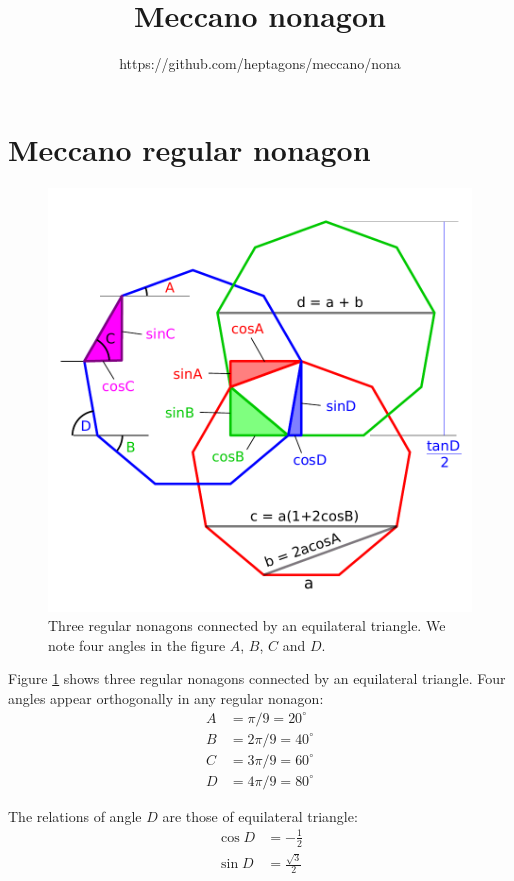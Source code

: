 \documentclass[11pt]{article}
\title{\textbf{Meccano nonagon}}
\author{https://github.com/heptagons/meccano/nona}
\date{}
\begin{document}
\maketitle

\section{Meccano regular nonagon}

\begin{figure}
\centering
\includegraphics[scale=0.75]{figs/3nonagons}
\caption{Three regular nonagons connected by an equilateral triangle.
We note four angles in the figure $A$, $B$, $C$ and $D$.}
\label{fig:1}
\end{figure}

Figure \ref{fig:1} shows three regular nonagons connected by an equilateral 
triangle. Four angles appear orthogonally in any regular nonagon:
\begin{align*}
A &= \pi/9 = 20^{\circ} \\
B &= 2\pi/9 = 40^{\circ} \\
C &= 3\pi/9 = 60^{\circ} \\
D &= 4\pi/9 = 80^{\circ}
\end{align*}

The relations of angle $D$ are those of equilateral triangle:
\begin{align*}
\cos{D} &= -\frac{1}{2}\\
\sin{D} &= \frac{\sqrt{3}}{2}
\end{align*}
\end{document}
